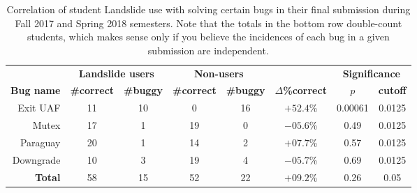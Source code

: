 \begin{table}[h]
	\begin{center}
		\small
	\begin{tabular}{r||cc|cc|c|cc}
		& \multicolumn{2}{c|}{\bf Landslide users} & \multicolumn{2}{c|}{\bf Non-users} & & \multicolumn{2}{c}{\bf Significance} \\
		\bf Bug name & \bf \#correct & \bf \#buggy & \bf \#correct & \bf \#buggy & \bf $\Delta$\%correct & $p$ & \bf cutoff \\
		\hline
		Exit UAF  & 11	& 10	& 0	& 16	& $+52.4$\%	& 0.00061	& 0.0125 \\
		Mutex     & 17	& 1	& 19	& 0	& $-05.6$\%	& 0.49 & 0.0125 \\
		Paraguay  & 20	& 1	& 14	& 2	& $+07.7$\%	& 0.57	& 0.0125 \\
		Downgrade & 10	& 3	& 19	& 4	& $-05.7$\%	& 0.69	& 0.0125 \\ %
		\hline
		\bf Total & 58	& 15	& 52	& 22	& $+09.2$\%	& 0.26 & 0.05 \\
	\end{tabular}
	\end{center}
	\caption[Correlation of student Landslide use with solving certain bugs.]
		{
		Correlation of student Landslide use with solving certain bugs in their final submission during Fall 2017 and Spring 2018 semesters.
		Note that the totals in the bottom row double-count students,
		which makes sense only if you believe the incidences of each bug in a given submission are independent.
		}
	\label{tab:eval-common-bugs}
\end{table}

